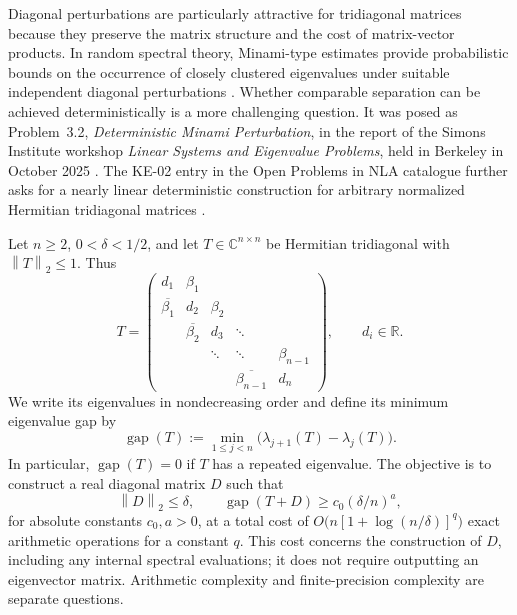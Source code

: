 \documentclass[10pt,a4paper]{article}
\newcommand{\norm}[1]{\left\lVert #1\right\rVert}
\DeclareMathOperator{\gap}{gap}
\newcommand{\R}{\mathbb R}
\newcommand{\C}{\mathbb C}
\begin{document}
Diagonal perturbations are particularly attractive for
tridiagonal matrices because they preserve the matrix structure
and the cost of matrix-vector products. In random spectral
theory, Minami-type estimates provide probabilistic bounds on
the occurrence of closely clustered eigenvalues under suitable
independent diagonal perturbations
\cite{Minami1996,CombesGerminetKlein2009}. Whether comparable
separation can be achieved deterministically is a more
challenging question. It was posed as Problem~3.2,
\emph{Deterministic Minami Perturbation}, in the report of the
Simons Institute workshop \emph{Linear Systems and Eigenvalue
Problems}, held in Berkeley in October 2025
\cite{AmselEtAl2026}. The KE-02 entry in the Open Problems
in NLA catalogue further asks for a nearly linear deterministic
construction for arbitrary normalized Hermitian tridiagonal
matrices \cite{CatalogueKE02}.

Let $n\geq2$, $0<\delta<1/2$, and let $T\in\C^{n\times n}$
be Hermitian tridiagonal with $\norm{T}_2\leq1$. Thus
\begin{equation}\label{eq:T}
T=\begin{pmatrix}
d_1&\beta_1&&&\\
\overline{\beta_1}&d_2&\beta_2&&\\
&\overline{\beta_2}&d_3&\ddots&\\
&&\ddots&\ddots&\beta_{n-1}\\
&&&\overline{\beta_{n-1}}&d_n
\end{pmatrix},\qquad d_i\in\R.
\end{equation}
We write its eigenvalues in nondecreasing order and
define its minimum eigenvalue gap by
\begin{equation}\label{eq:gap}
\gap(T):=\min_{1\leq j<n}
\bigl(\lambda_{j+1}(T)-\lambda_j(T)\bigr).
\end{equation}
In particular, $\gap(T)=0$ if $T$ has a repeated eigenvalue.
The objective is to construct a real diagonal matrix $D$
such that
\begin{equation}\label{eq:target}
\norm{D}_2\leq\delta,\qquad
\gap(T+D)\geq c_0(\delta/n)^a,
\end{equation}
for absolute constants $c_0,a>0$, at a total cost of
$O\bigl(n[1+\log(n/\delta)]^q\bigr)$ exact arithmetic
operations for a constant $q$.
This cost concerns the construction of $D$, including
any internal spectral evaluations; it does not require
outputting an eigenvector matrix. Arithmetic complexity
and finite-precision complexity are separate questions.
\end{document}
